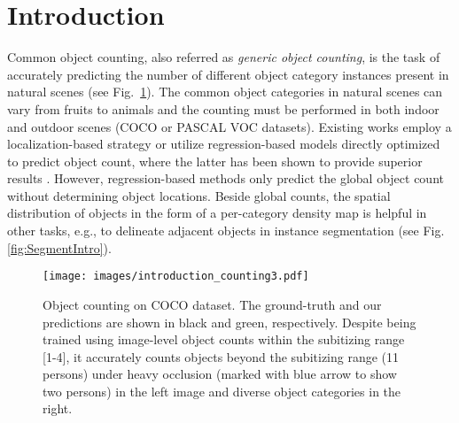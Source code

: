 \documentclass[10pt,twocolumn,letterpaper]{article}
\begin{document}
\section{Introduction}
Common object counting, also referred as \textit{generic object counting}, is the task of accurately predicting the number of different object category instances present in natural scenes (see Fig.~\ref{fig:CountingIntro}).  The common object categories in natural scenes can vary from fruits to animals and the counting must be performed  in both indoor and outdoor  scenes (\eg COCO or PASCAL VOC datasets). Existing works employ a localization-based strategy or utilize regression-based models directly optimized to predict object count, where the latter has been shown to provide superior results \cite{Chattopadhyay_2017_CVPR}. However, regression-based methods only predict the global object count without determining object locations. Beside global counts, the spatial distribution of objects in the form of a  per-category density map is helpful in other tasks, e.g., to delineate adjacent objects in instance segmentation  (see Fig. \ref{fig:SegmentIntro}). 
 
 
 




\begin{figure}[t]
		
			\texttt{[image: images/introduction\_counting3.pdf]}\\  \vspace{-0.30 cm}

			\caption{Object counting on COCO dataset. The ground-truth and our predictions are shown in black and green, respectively. Despite being trained using image-level object counts within the subitizing range [1-4], it accurately counts objects beyond the subitizing range (11 persons) under heavy occlusion (marked with blue arrow to show two persons) in the left image and diverse object categories in the right.
			}
			\label{fig:CountingIntro}
\end{figure}
\end{document}
